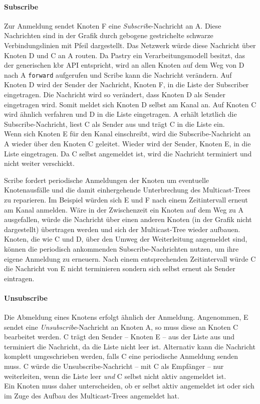\paragraph{Subscribe}
Zur Anmeldung sendet Knoten F eine \emph{Subscribe}-Nachricht an A. Diese Nachrichten sind in der Grafik durch gebogene gestrichelte schwarze Verbindungslinien mit Pfeil dargestellt. Das Netzwerk würde diese Nachricht über Knoten D und C an A routen. Da Pastry ein Verarbeitungsmodell besitzt, das der generischen \ac{kbr} API entspricht, wird an allen Knoten auf dem Weg von D nach A \texttt{forward} aufgerufen und Scribe kann die Nachricht verändern. Auf Knoten D wird der Sender der Nachricht, Knoten F, in die Liste der Subscriber eingetragen. Die Nachricht wird so verändert, dass Knoten D als Sender eingetragen wird. Somit meldet sich Knoten D selbst am Kanal an. Auf Knoten C wird ähnlich verfahren und D in die Liste eingetragen. A erhält letztlich die Subscribe-Nachricht, liest C als Sender aus und trägt C in die Liste ein.\\
Wenn sich Knoten E für den Kanal einschreibt, wird die Subscribe-Nachricht an A wieder über den Knoten C geleitet. Wieder wird der Sender, Knoten E, in die Liste eingetragen. Da C selbst angemeldet ist, wird die Nachricht terminiert und nicht weiter verschickt.

Scribe fordert periodische Anmeldungen der Knoten um eventuelle Knotenausfälle und die damit einhergehende Unterbrechung des Multicast-Trees zu reparieren. Im Beispiel würden sich E und F nach einem Zeitintervall erneut am Kanal anmelden. Wäre in der Zwischenzeit ein Knoten auf dem Weg zu A ausgefallen, würde die Nachricht über einen anderen Knoten (in der Grafik nicht dargestellt) übertragen werden und sich der Multicast-Tree wieder aufbauen. Knoten, die wie C und D, über den Umweg der Weiterleitung angemeldet sind, können die periodisch ankommenden Subscribe-Nachrichten nutzen, um ihre eigene Anmeldung zu erneuern. Nach einem entsprechenden Zeitintervall würde C die Nachricht von E nicht terminieren sondern sich selbst erneut als Sender eintragen.

\paragraph{Unsubscribe}
Die Abmeldung eines Knotens erfolgt ähnlich der Anmeldung. Angenommen, E sendet eine \emph{Unsubscribe}-Nachricht an Knoten A, so muss diese an Knoten C bearbeitet werden. C trägt den Sender -- Knoten E -- aus der Liste aus und terminiert die Nachricht, da die Liste nicht leer ist. Alternativ kann die Nachricht komplett umgeschrieben werden, falls C eine periodische Anmeldung senden muss. C würde die Unsubscribe-Nachricht -- mit C als Empfänger -- nur weiterleiten, wenn die Liste leer \emph{und} C selbst nicht aktiv angemeldet ist.\\
Ein Knoten muss daher unterscheiden, ob er selbst aktiv angemeldet ist oder sich im Zuge des Aufbau des Multicast-Trees angemeldet hat.

